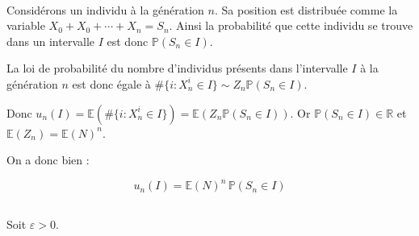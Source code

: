 \documentclass[12pt,titlepage=true]{article}
\newcommand{\esp}{\mathbb{E}}
\renewcommand{\P}{\mathbb{P}}
\newcommand{\R}{\mathbb{R}}
\begin{document}
			\paragraph{}Considérons un individu à la génération $n$. Sa position est distribuée comme la variable $X_0 + X_0 + \cdots + X_n = S_n$. Ainsi la probabilité que cette individu se trouve dans un intervalle $I$ est donc $\P(S_n\in I)$.
			
			La loi de probabilité du nombre d'individus présents dans l'intervalle $I$ à la génération $n$ est donc égale à $\# \{i:X_n^i\in I\} \sim Z_n \P(S_n\in I)$.
			
			Donc $u_n(I)=\esp(\# \{i:X_n^i\in I\})=\esp(Z_n \P(S_n\in I))$. Or $\P(S_n\in I) \in \R$ et $\esp(Z_n)=\esp(N)^n$.
			
			On a donc bien :
			
			\begin{equation}
				\boxed{u_n(I)=\esp(N)^n\,\P(S_n\in I)} \label{resQ21}
			\end{equation}
			
		\subsection{} %
			
			Soit $\varepsilon>0$. 
			
\end{document}
